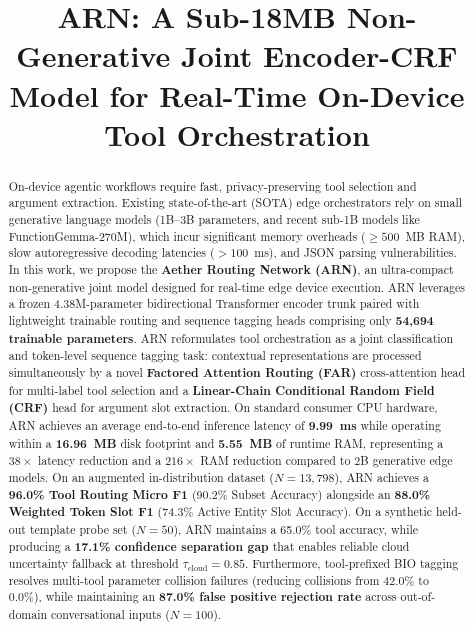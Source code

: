 \documentclass[conference]{IEEEtran}
\begin{document}
\title{ARN: A Sub-18MB Non-Generative Joint Encoder-CRF Model for Real-Time On-Device Tool Orchestration}

\author{
}

\maketitle

\begin{abstract}
On-device agentic workflows require fast, privacy-preserving tool selection and argument extraction. Existing state-of-the-art (SOTA) edge orchestrators rely on small generative language models (1B--3B parameters, and recent sub-1B models like FunctionGemma-270M), which incur significant memory overheads ($\ge 500$~MB RAM), slow autoregressive decoding latencies ($>100$~ms), and JSON parsing vulnerabilities. In this work, we propose the \textbf{Aether Routing Network (ARN)}, an ultra-compact non-generative joint model designed for real-time edge device execution. ARN leverages a frozen 4.38M-parameter bidirectional Transformer encoder trunk paired with lightweight trainable routing and sequence tagging heads comprising only \textbf{54,694 trainable parameters}. ARN reformulates tool orchestration as a joint classification and token-level sequence tagging task: contextual representations are processed simultaneously by a novel \textbf{Factored Attention Routing (FAR)} cross-attention head for multi-label tool selection and a \textbf{Linear-Chain Conditional Random Field (CRF)} head for argument slot extraction. On standard consumer CPU hardware, ARN achieves an average end-to-end inference latency of \textbf{9.99~ms} while operating within a \textbf{16.96~MB} disk footprint and \textbf{5.55~MB} of runtime RAM, representing a $38\times$ latency reduction and a $216\times$ RAM reduction compared to 2B generative edge models. On an augmented in-distribution dataset ($N=13,798$), ARN achieves a \textbf{96.0\% Tool Routing Micro F1} (90.2\% Subset Accuracy) alongside an \textbf{88.0\% Weighted Token Slot F1} (74.3\% Active Entity Slot Accuracy). On a synthetic held-out template probe set ($N=50$), ARN maintains a 65.0\% tool accuracy, while producing a \textbf{17.1\% confidence separation gap} that enables reliable cloud uncertainty fallback at threshold $\tau_{\text{cloud}} = 0.85$. Furthermore, tool-prefixed BIO tagging resolves multi-tool parameter collision failures (reducing collisions from 42.0\% to 0.0\%), while maintaining an \textbf{87.0\% false positive rejection rate} across out-of-domain conversational inputs ($N=100$).
\end{abstract}
\end{document}
